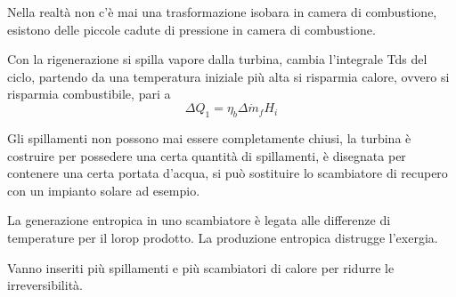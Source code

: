 Nella realtà non c'è mai una trasformazione isobara in camera di combustione,
esistono delle piccole cadute di pressione in camera di combustione.

Con la rigenerazione si spilla vapore dalla turbina, cambia l'integrale Tds del
ciclo, partendo da una temperatura iniziale più alta si risparmia calore,
ovvero si risparmia combustibile, pari a
$$
\Delta Q_1 = \eta_b\Delta \dot{m}_f H_i
$$

Gli spillamenti non possono mai essere completamente chiusi, la turbina è
costruire per possedere una certa quantità di spillamenti, è disegnata per
contenere una certa portata d'acqua, si può sostituire lo scambiatore di
recupero con un impianto solare ad esempio.


La generazione entropica in uno scambiatore è legata alle differenze di
temperature per il lorop prodotto.
La produzione entropica distrugge l'exergia.

Vanno inseriti più spillamenti e più scambiatori di calore per ridurre le
irreversibilità.


